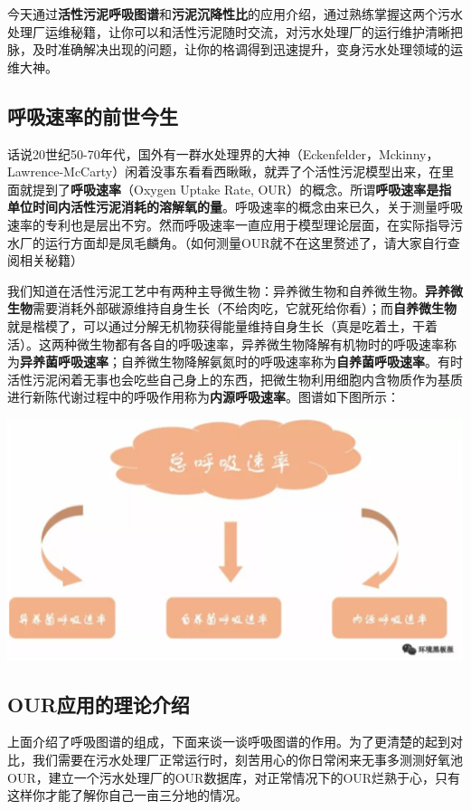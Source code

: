 \documentclass[]{book}
\begin{document}
今天通过\textbf{活性污泥呼吸图谱}和\textbf{污泥沉降性比}的应用介绍，通过熟练掌握这两个污水处理厂运维秘籍，让你可以和活性污泥随时交流，对污水处理厂的运行维护清晰把脉，及时准确解决出现的问题，让你的格调得到迅速提升，变身污水处理领域的运维大神。

\subsection{呼吸速率的前世今生}

话说20世纪50-70年代，国外有一群水处理界的大神（Eckenfelder，Mckinny，Lawrence-McCarty）闲着没事东看看西瞅瞅，就弄了个活性污泥模型出来，在里面就提到了\textbf{呼吸速率}（Oxygen
Uptake Rate,
OUR）的概念。所谓\textbf{呼吸速率是指单位时间内活性污泥消耗的溶解氧的量}。呼吸速率的概念由来已久，关于测量呼吸速率的专利也是层出不穷。然而呼吸速率一直应用于模型理论层面，在实际指导污水厂的运行方面却是凤毛麟角。（如何测量OUR就不在这里赘述了，请大家自行查阅相关秘籍）

我们知道在活性污泥工艺中有两种主导微生物：异养微生物和自养微生物。\textbf{异养微生物}需要消耗外部碳源维持自身生长（不给肉吃，它就死给你看）；而\textbf{自养微生物}就是楷模了，可以通过分解无机物获得能量维持自身生长（真是吃着土，干着活）。这两种微生物都有各自的呼吸速率，异养微生物降解有机物时的呼吸速率称为\textbf{异养菌呼吸速率}；自养微生物降解氨氮时的呼吸速率称为\textbf{自养菌呼吸速率}。有时活性污泥闲着无事也会吃些自己身上的东西，把微生物利用细胞内含物质作为基质进行新陈代谢过程中的呼吸作用称为\textbf{内源呼吸速率}。图谱如下图所示：

\includegraphics[width=6.67in]{images/os2}

\subsection{OUR应用的理论介绍}\label{our}

上面介绍了呼吸图谱的组成，下面来谈一谈呼吸图谱的作用。为了更清楚的起到对比，我们需要在污水处理厂正常运行时，刻苦用心的你日常闲来无事多测测好氧池OUR，建立一个污水处理厂的OUR数据库，对正常情况下的OUR烂熟于心，只有这样你才能了解你自己一亩三分地的情况。
\end{document}
